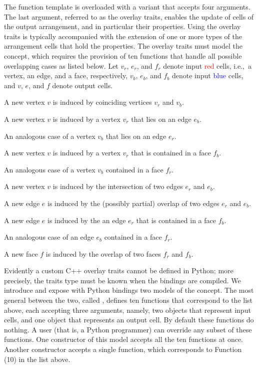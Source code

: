 The  function template is overloaded
with a variant that accepts four arguments. The last argument,
referred to as the overlay traits, enables the update of cells of the
output arrangement, and in particular their properties. Using the
overlay traits is typically accompanied with the extension of one or
more types of the arrangement cells that hold the properties. The
overlay traits must model the  concept,
which requires the provision of ten functions that handle all possible
overlapping cases as listed below. Let $v_r$, $e_r$, and $f_r$ denote
input \textcolor{red}{red} cells, i.e.,~a vertex, an edge, and a face,
respectively, $v_b$, $e_b$, and $f_b$ denote input
\textcolor{blue}{blue} cells, and $v$, $e$, and $f$ denote output
cells.
\begin{compactenum}
\item A new vertex $v$ is induced by coinciding vertices $v_r$ and $v_b$.
\item A new vertex $v$ is induced by a vertex $v_r$ that lies on an edge $e_b$.
\item An analogous case of a vertex $v_b$ that lies on an edge $e_r$.
\item A new vertex $v$ is induced by a vertex $v_r$ that is contained in a face $f_b$.
\item An analogous case of a vertex $v_b$ contained in a face $f_r$.
\item A new vertex $v$ is induced by the intersection of two edges $e_r$ and $e_b$.
\item A new edge $e$ is induced by the (possibly partial) overlap of two edges $e_r$ and $e_b$.
\item A new edge $e$ is induced by the an edge $e_r$ that is contained in a face $f_b$.
\item An analogous case of an edge $e_b$ contained in a face $f_r$.
\item A new face $f$ is induced by the overlap of two faces $f_r$ and $f_b$.
\end{compactenum}

Evidently a custom C++ overlay traits cannot be defined in Python;
more precisely, the traits type must be known when the bindings are
compiled. We introduce and expose with Python bindings two models of
the  concept. The most general between the
two, called , defines ten functions
that correspond to the list above, each accepting three arguments,
namely, two objects that represent input cells, and one object that
represents an output cell. By default these functions do nothing. A user
(that is, a Python programmer) can override any subset of these
functions. One constructor of this model accepts all the ten functions
at once. Another constructor accepts a single function, which
corresponds to Function (10) in the list above.

